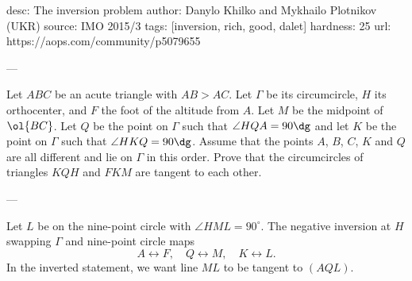 desc:  The inversion problem
author: Danylo Khilko and Mykhailo Plotnikov (UKR)
source:  IMO 2015/3
tags:  [inversion, rich, good, dalet]
hardness: 25
url: https://aops.com/community/p5079655

---

Let $ABC$ be an acute triangle with $AB > AC$.
Let $\Gamma$ be its circumcircle, $H$ its orthocenter, and $F$ the foot of the altitude from $A$.
Let $M$ be the midpoint of $\ol{BC}$.
Let $Q$ be the point on $\Gamma$ such that $\angle HQA = 90\dg$
and let $K$ be the point on $\Gamma$ such that $\angle HKQ = 90\dg$.
Assume that the points $A$, $B$, $C$, $K$ and $Q$ are all different and lie on $\Gamma$ in this order.
Prove that the circumcircles of triangles $KQH$ and $FKM$ are tangent to each other.

---

Let $L$ be on the nine-point circle with $\angle HML = 90^{\circ}$.
The negative inversion at $H$ swapping $\Gamma$ and nine-point circle maps
\[ A \longleftrightarrow F, \quad
  Q \longleftrightarrow M, \quad
  K \longleftrightarrow L. \]
In the inverted statement, we want line $ML$ to be tangent to $(AQL)$.


